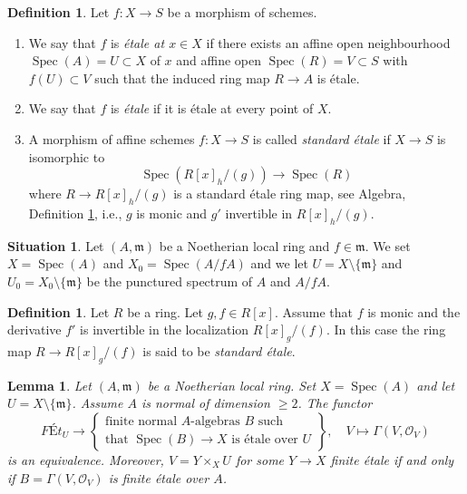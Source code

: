 \documentclass{amsart}
\theoremstyle{plain}
\newtheorem{lemma}[subsection]{Lemma}
\theoremstyle{definition}
\newtheorem{definition}[subsection]{Definition}
\newtheorem{situation}[subsection]{Situation}
\theoremstyle{remark}
\numberwithin{equation}{subsection}
\def\Spec{\mathop{\mathrm{Spec}}}
\begin{document}
\begin{definition}
\label{morphisms-definition-etale}
Let $f : X \to S$ be a morphism of schemes.
\begin{enumerate}
\item We say that $f$ is {\it \'etale at $x \in X$} if
there exists an affine open neighbourhood $\Spec(A) = U \subset X$
of $x$ and affine open $\Spec(R) = V \subset S$
with $f(U) \subset V$ such that the induced ring map
$R \to A$ is \'etale.
\item We say that $f$ is {\it \'etale} if it is \'etale at every point of $X$.
\item A morphism of affine schemes $f : X \to S$ is called
{\it standard \'etale} if $X \to S$ is isomorphic to
$$
\Spec(R[x]_h/(g)) \to \Spec(R)
$$
where $R \to R[x]_h/(g)$ is a standard \'etale ring map, see
Algebra, Definition \ref{algebra-definition-standard-etale},
i.e., $g$ is monic and $g'$ invertible in $R[x]_h/(g)$.
\end{enumerate}
\end{definition}

\begin{situation}
\label{situation-local-lefschetz}
Let $(A, \mathfrak m)$ be a Noetherian local ring and $f \in \mathfrak m$.
We set $X = \Spec(A)$ and $X_0 = \Spec(A/fA)$ and we
let $U = X \setminus \{\mathfrak m\}$ and
$U_0 = X_0 \setminus \{\mathfrak m\}$ be the punctured spectrum of
$A$ and $A/fA$.
\end{situation}

\begin{definition}
\label{algebra-definition-standard-etale}
Let $R$ be a ring. Let $g , f  \in R[x]$.
Assume that $f$ is monic and the derivative $f'$ is invertible in
the localization $R[x]_g/(f)$.
In this case the ring map $R \to R[x]_g/(f)$ is said to be
{\it standard \'etale}.
\end{definition}

\begin{lemma}
\label{lemma-reformulate-purity-normal}
Let $(A, \mathfrak m)$ be a Noetherian local ring. Set $X = \Spec(A)$
and let $U = X \setminus \{\mathfrak m\}$. Assume $A$ is normal
of dimension $\geq 2$. The functor
$$
\textit{F\'Et}_U \longrightarrow
\left\{
\begin{matrix}
\text{finite normal }A\text{-algebras }B\text{ such} \\
\text{that }\Spec(B) \to X\text{ is \'etale over }U
\end{matrix}
\right\},
\quad
V \longmapsto \Gamma(V, \mathcal{O}_V)
$$
is an equivalence. Moreover, $V = Y \times_X U$ for some $Y \to X$
finite \'etale if and only if $B = \Gamma(V, \mathcal{O}_V)$
is finite \'etale over $A$.
\end{lemma}
\end{document}
